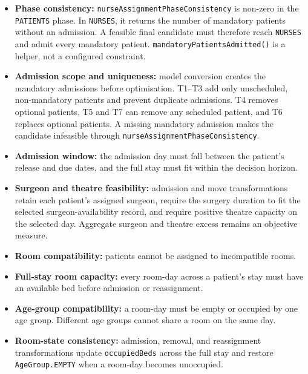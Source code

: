 \documentclass[11pt,a4paper]{article}
\begin{document}
\begin{itemize}
    \item \textbf{Phase consistency:} \texttt{nurseAssignmentPhaseConsistency} is non-zero in the \texttt{PATIENTS} phase. In \texttt{NURSES}, it returns the number of mandatory patients without an admission. A feasible final candidate must therefore reach \texttt{NURSES} and admit every mandatory patient. \texttt{mandatoryPatientsAdmitted()} is a helper, not a configured constraint.

    \item \textbf{Admission scope and uniqueness:} model conversion creates the mandatory admissions before optimisation. T1--T3 add only unscheduled, non-mandatory patients and prevent duplicate admissions. T4 removes optional patients, T5 and T7 can remove any scheduled patient, and T6 replaces optional patients. A missing mandatory admission makes the candidate infeasible through \texttt{nurseAssignmentPhaseConsistency}.

    \item \textbf{Admission window:} the admission day must fall between the patient's release and due dates, and the full stay must fit within the decision horizon.

    \item \textbf{Surgeon and theatre feasibility:} admission and move transformations retain each patient's assigned surgeon, require the surgery duration to fit the selected surgeon-availability record, and require positive theatre capacity on the selected day. Aggregate surgeon and theatre excess remains an objective measure.

    \item \textbf{Room compatibility:} patients cannot be assigned to incompatible rooms.

    \item \textbf{Full-stay room capacity:} every room-day across a patient's stay must have an available bed before admission or reassignment.

    \item \textbf{Age-group compatibility:} a room-day must be empty or occupied by one age group. Different age groups cannot share a room on the same day.

    \item \textbf{Room-state consistency:} admission, removal, and reassignment transformations update \texttt{occupiedBeds} across the full stay and restore \texttt{AgeGroup.EMPTY} when a room-day becomes unoccupied.


\end{itemize}
\end{document}
